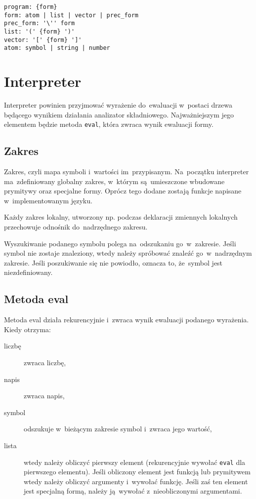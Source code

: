 \documentclass[a4paper,11pt]{article}
\begin{document}
\begin{verbatim}
program: {form}
form: atom | list | vector | prec_form
prec_form: '\'' form
list: '(' {form} ')'
vector: '[' {form} ']'
atom: symbol | string | number
\end{verbatim}

\section{Interpreter}

Interpreter powinien przyjmować wyrażenie do~ewaluacji w~postaci drzewa
będącego wynikiem działania analizator składniowego. Najważniejszym jego
elementem będzie metoda \verb+eval+, która zwraca wynik ewaluacji formy.

\subsection{Zakres}

Zakres, czyli mapa symboli i~wartości im~przypisanym. Na~początku interpreter
ma~zdefiniowany globalny zakres, w~którym są~umieszczone wbudowane prymitywy
oraz specjalne formy. Oprócz tego dodane zostają funkcje napisane
w~implementowanym języku.

Każdy zakres lokalny, utworzony np. podczas deklaracji zmiennych lokalnych
przechowuje odnośnik do~nadrzędnego zakresu.

Wyszukiwanie podanego symbolu polega na~odszukaniu go~w~zakresie. Jeśli symbol
nie zostaje znaleziony, wtedy należy spróbować znaleźć go~w~nadrzędnym
zakresie. Jeśli poszukiwanie się nie powiodło, oznacza to, że~symbol jest
niezdefiniowany.

\subsection{Metoda eval}

Metoda eval działa rekurencyjnie i~zwraca wynik ewaluacji podanego wyrażenia.
Kiedy otrzyma:
\begin{description}
\item[liczbę] zwraca liczbę,
\item[napis] zwraca napis,
\item[symbol] odszukuje w~bieżącym zakresie symbol i~zwraca jego wartość,
\item[lista] wtedy należy obliczyć pierwszy element (rekurencyjnie wywołać
  \verb+eval+ dla pierwszego elementu). Jeśli obliczony element jest funkcją
  lub prymitywem wtedy należy obliczyć argumenty i~wywołać funkcję. Jeśli zaś
  ten element jest specjalną formą, należy ją~wywołać z~nieobliczonymi
  argumentami.
\end{description}
\end{document}
